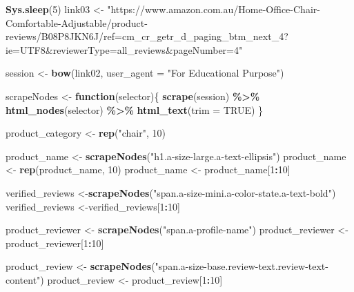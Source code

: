 \documentclass[
]{article}
\newenvironment{Shaded}{\begin{snugshade}}{\end{snugshade}}
\newcommand{\AttributeTok}[1]{\textcolor[rgb]{0.13,0.29,0.53}{#1}}
\newcommand{\ConstantTok}[1]{\textcolor[rgb]{0.56,0.35,0.01}{#1}}
\newcommand{\ControlFlowTok}[1]{\textcolor[rgb]{0.13,0.29,0.53}{\textbf{#1}}}
\newcommand{\DecValTok}[1]{\textcolor[rgb]{0.00,0.00,0.81}{#1}}
\newcommand{\FunctionTok}[1]{\textcolor[rgb]{0.13,0.29,0.53}{\textbf{#1}}}
\newcommand{\NormalTok}[1]{#1}
\newcommand{\OtherTok}[1]{\textcolor[rgb]{0.56,0.35,0.01}{#1}}
\newcommand{\SpecialCharTok}[1]{\textcolor[rgb]{0.81,0.36,0.00}{\textbf{#1}}}
\newcommand{\StringTok}[1]{\textcolor[rgb]{0.31,0.60,0.02}{#1}}
\begin{document}
\begin{Shaded}
\begin{Highlighting}[]
   \FunctionTok{Sys.sleep}\NormalTok{(}\DecValTok{5}\NormalTok{)}
\NormalTok{link03 }\OtherTok{\textless{}{-}} \StringTok{"https://www.amazon.com.au/Home{-}Office{-}Chair{-}Comfortable{-}Adjustable/product{-}reviews/B08P8JKN6J/ref=cm\_cr\_getr\_d\_paging\_btm\_next\_4?ie=UTF8\&reviewerType=all\_reviews\&pageNumber=4"}


\NormalTok{  session }\OtherTok{\textless{}{-}} \FunctionTok{bow}\NormalTok{(link02,}
               \AttributeTok{user\_agent =} \StringTok{"For Educational Purpose"}\NormalTok{)}

\NormalTok{  scrapeNodes }\OtherTok{\textless{}{-}} \ControlFlowTok{function}\NormalTok{(selector)\{}
    \FunctionTok{scrape}\NormalTok{(session) }\SpecialCharTok{\%\textgreater{}\%}
      \FunctionTok{html\_nodes}\NormalTok{(selector) }\SpecialCharTok{\%\textgreater{}\%}
      \FunctionTok{html\_text}\NormalTok{(}\AttributeTok{trim =} \ConstantTok{TRUE}\NormalTok{)}
\NormalTok{  \}}

\NormalTok{  product\_category }\OtherTok{\textless{}{-}} \FunctionTok{rep}\NormalTok{(}\StringTok{"chair"}\NormalTok{, }\DecValTok{10}\NormalTok{)}

\NormalTok{  product\_name }\OtherTok{\textless{}{-}} \FunctionTok{scrapeNodes}\NormalTok{(}\StringTok{"h1.a{-}size{-}large.a{-}text{-}ellipsis"}\NormalTok{)}
\NormalTok{  product\_name }\OtherTok{\textless{}{-}} \FunctionTok{rep}\NormalTok{(product\_name, }\DecValTok{10}\NormalTok{)}
\NormalTok{  product\_name }\OtherTok{\textless{}{-}}\NormalTok{ product\_name[}\DecValTok{1}\SpecialCharTok{:}\DecValTok{10}\NormalTok{]}
  
\NormalTok{  verified\_reviews }\OtherTok{\textless{}{-}}\FunctionTok{scrapeNodes}\NormalTok{(}\StringTok{"span.a{-}size{-}mini.a{-}color{-}state.a{-}text{-}bold"}\NormalTok{)}
\NormalTok{  verified\_reviews }\OtherTok{\textless{}{-}}\NormalTok{verified\_reviews[}\DecValTok{1}\SpecialCharTok{:}\DecValTok{10}\NormalTok{]}
  
\NormalTok{  product\_reviewer }\OtherTok{\textless{}{-}} \FunctionTok{scrapeNodes}\NormalTok{(}\StringTok{"span.a{-}profile{-}name"}\NormalTok{)}
\NormalTok{  product\_reviewer }\OtherTok{\textless{}{-}}\NormalTok{ product\_reviewer[}\DecValTok{1}\SpecialCharTok{:}\DecValTok{10}\NormalTok{]}
  
\NormalTok{  product\_review }\OtherTok{\textless{}{-}} \FunctionTok{scrapeNodes}\NormalTok{(}\StringTok{"span.a{-}size{-}base.review{-}text.review{-}text{-}content"}\NormalTok{)}
\NormalTok{  product\_review }\OtherTok{\textless{}{-}}\NormalTok{ product\_review[}\DecValTok{1}\SpecialCharTok{:}\DecValTok{10}\NormalTok{]}
  

\end{Highlighting}
\end{Shaded}
\end{document}
